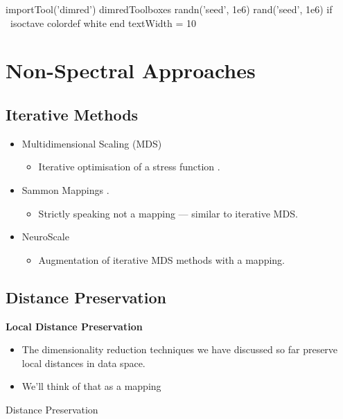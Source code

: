 \begin{matlab}
  importTool('dimred')
  dimredToolboxes
  randn('seed', 1e6)
  rand('seed', 1e6)
  if ~isoctave
    colordef white
  end
  textWidth = 10
\end{matlab}

\chapter{Non-Spectral Approaches}
\label{chap:iterative}


\section{Iterative Methods}
\begin{itemize}
\item Multidimensional Scaling (MDS) 

  \begin{itemize}
  \item Iterative optimisation of a stress function \cite{Kruskal:mds64}.
  \end{itemize}
\item Sammon Mappings \cite{Sammon:nonlinear69}.

  \begin{itemize}
  \item Strictly speaking not a mapping --- similar to iterative MDS.
  \end{itemize}
\item NeuroScale \cite{Lowe:neuroscale96}

  \begin{itemize}
  \item Augmentation of iterative MDS methods with a mapping.
  \end{itemize}
\end{itemize}

\section{Distance Preservation}

\textbf{Local Distance Preservation} 
\begin{itemize}
\item The dimensionality reduction techniques we have discussed so far preserve
  local distances in data space.
\item We'll think of that as a mapping
\end{itemize}
Distance Preservation

